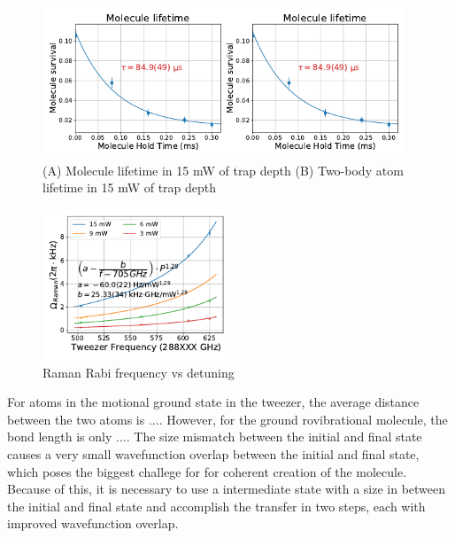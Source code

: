 \documentclass[aps,prl,twocolumn,groupedaddress]{revtex4-1}
\newcommand{\todo}[1]{}
\begin{document}
\begin{figure}
  \includegraphics[height=4.5cm]{fig3.pdf}
  \caption{
    (A) Molecule lifetime in 15 mW of trap depth \todo{lifetime number}
    (B) Two-body atom lifetime in 15 mW of trap depth \todo{lifetime number,
      subtraction of single body, photoassociation rate}
    \label{f-lifetime}}
\end{figure}

\begin{figure}
  \includegraphics[height=4.5cm]{fig4.pdf}
  \caption{Raman Rabi frequency vs detuning
    \label{f-det}}
\end{figure}

\todo{Previous result}
\todo{talk about size mismatch, two step transfer/weakly bound molecule in intro}

For atoms in the motional ground state in the tweezer, the average distance between the two atoms is $...$. However, for the ground rovibrational molecule, the bond length is only $...$. The size mismatch between the initial and final state causes a very small wavefunction overlap between the initial and final state, \todo{overlap is always 0, the accurate description here is the product of wavefunction overlap through any reasonable intermediate state, or the density-density correlation which serves as a reasonable estimate of the matrix element through different pathways} which poses the biggest challege for for coherent creation of the molecule. Because of this, it is necessary to use a intermediate state with a size in between the initial and final state and accomplish the transfer in two steps, each with improved wavefunction overlap.
\end{document}
